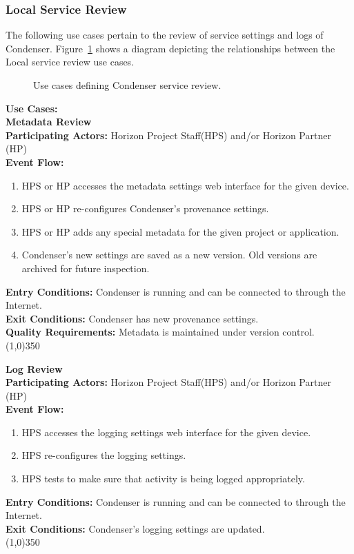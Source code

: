\subsubsection{Local Service Review}	
The following use cases pertain to the review of service settings and logs of Condenser. Figure~\ref{LocalServiceReviewUse} shows a diagram depicting the relationships between the Local service review use cases.
\begin{center}
	\begin{figure}[htbp]
		\caption{Use cases defining Condenser service review.\label{LocalServiceReviewUse}}
	\end{figure}
\end{center}	
\textbf{Use Cases:}\\
	 
	\textbf{Metadata Review} \\	 
	\textbf{Participating Actors:} Horizon Project Staff(HPS) and/or Horizon Partner (HP)\\
	\textbf{Event Flow:}
	\begin{enumerate}
\item HPS or HP accesses the metadata settings web interface for the given device. 
\item HPS or HP re-configures Condenser's provenance settings.
\item HPS or HP adds any special metadata for the given project or application.
\item Condenser's new settings are saved as a new version. Old versions are archived for future inspection.
    \end{enumerate}
	\textbf{Entry Conditions:} Condenser is running and can be connected to through the Internet.\\
	\textbf{Exit Conditions:} Condenser has new provenance settings.\\
	\textbf{Quality Requirements:} Metadata is maintained under version control.\\
	\line(1,0){350}		
			 
	\textbf{Log Review} \\	 
	\textbf{Participating Actors:} Horizon Project Staff(HPS) and/or Horizon Partner (HP) \\
	\textbf{Event Flow:}
	\begin{enumerate}
\item HPS accesses the logging settings web interface for the given device. 
\item HPS re-configures the logging settings.
\item HPS tests to make sure that activity is being logged appropriately.
    \end{enumerate}
	\textbf{Entry Conditions:} Condenser is running and can be connected to through the Internet.\\
	\textbf{Exit Conditions:} Condenser's logging settings are updated.\\
	\line(1,0){350}			
			 
